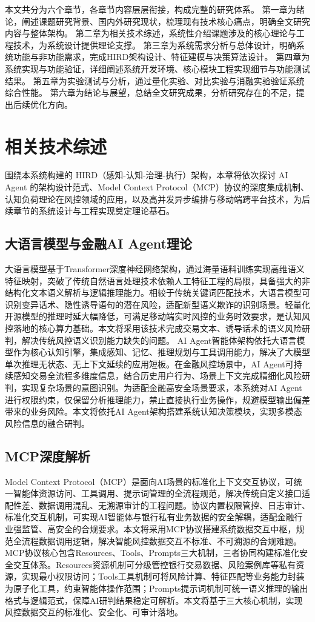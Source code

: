 \documentclass[twoside,openright]{xduugthesis}
\begin{document}
本文共分为六个章节，各章节内容层层衔接，构成完整的研究体系。
第一章为绪论，阐述课题研究背景、国内外研究现状，梳理现有技术核心痛点，明确全文研究内容与整体架构。
第二章为相关技术综述，系统性介绍课题涉及的核心理论与工程技术，为系统设计提供理论支撑。
第三章为系统需求分析与总体设计，明确系统功能与非功能需求，完成HIRD架构设计、特征建模与决策算法设计。
第四章为系统实现与功能验证，详细阐述系统开发环境、核心模块工程实现细节与功能测试结果。
第五章为实验测试与分析，通过量化实验、对比实验与消融实验验证系统综合性能。
第六章为结论与展望，总结全文研究成果，分析研究存在的不足，提出后续优化方向。


\chapter{相关技术综述}
围绕本系统构建的 HIRD（感知-认知-治理-执行）架构，本章将依次探讨 AI Agent 的架构设计范式、Model Context Protocol（MCP）协议的深度集成机制、认知负荷理论在风控领域的应用，以及高并发异步编排与移动端跨平台技术，为后续章节的系统设计与工程实现奠定理论基石。
\section{大语言模型与金融AI Agent理论}
大语言模型基于Transformer深度神经网络架构，通过海量语料训练实现高维语义特征映射，突破了传统自然语言处理技术依赖人工特征工程的局限，具备强大的非结构化文本语义解析与逻辑推理能力\cite{nicolaou2025llm}。相较于传统关键词匹配技术，大语言模型可识别变异话术、隐性诱导语句的潜在风险，适配新型语义欺诈的识别场景。轻量化开源模型的推理时延大幅降低，可满足移动端实时风控的业务时效要求，是认知风控落地的核心算力基础。本文将采用该技术完成交易文本、诱导话术的语义风险研判，解决传统风控语义识别能力缺失的问题。
AI Agent智能体架构依托大语言模型作为核心认知引擎，集成感知、记忆、推理规划与工具调用能力，解决了大模型单次推理无状态、无上下文延续的应用短板\cite{ zangana2025llm}。在金融风控场景中，AI Agent可持续感知交易全流程多维度信息，结合历史用户行为、场景上下文完成精细化风险研判，实现复杂场景的意图识别。为适配金融高安全场景要求，本系统对AI Agent进行权限约束，仅保留分析推理能力，禁止直接执行业务操作，规避模型输出偏差带来的业务风险。本文将依托AI Agent架构搭建系统认知决策模块，实现多模态风险信息的融合研判。

\section{MCP深度解析}
Model Context Protocol（MCP）是面向AI场景的标准化上下文交互协议，可统一智能体资源访问、工具调用、提示词管理的全流程规范，解决传统自定义接口适配性差、数据调用混乱、无溯源审计的工程问题。协议内置权限管控、日志审计、标准化交互机制，可实现AI智能体与银行私有业务数据的安全解耦，适配金融行业强监管、高安全的合规要求。本文将采用MCP协议搭建系统数据交互中枢，规范全流程数据调用逻辑，解决智能风控数据交互不标准、不可溯源的合规难题。
MCP协议核心包含Resources、Tools、Prompts三大机制，三者协同构建标准化安全交互体系。Resources资源机制可分级管控银行交易数据、风险案例库等私有资源，实现最小权限访问；Tools工具机制可将风险计算、特征匹配等业务能力封装为原子化工具，约束智能体操作范围；Prompts提示词机制可统一语义推理的输出格式与逻辑范式，保障AI研判结果稳定可解析。本文将基于三大核心机制，实现风控数据交互的标准化、安全化、可审计落地。
\end{document}
